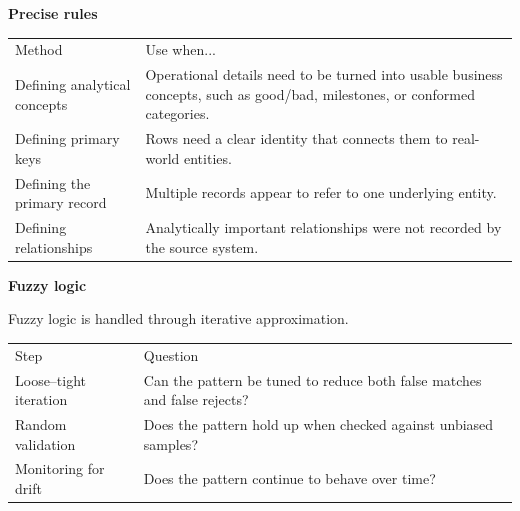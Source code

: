 \documentclass[10pt,openany,10pt]{book}
\newcounter{none}
\let\podeToprule\toprule
\let\podeMidrule\midrule
\let\podeBottomrule\bottomrule
\renewcommand{\toprule}{\arrayrulecolor{pbiGrid}\podeToprule}
\renewcommand{\midrule}{\arrayrulecolor{pbiGrid}\podeMidrule}
\renewcommand{\bottomrule}{\arrayrulecolor{pbiGrid}\podeBottomrule}
\begin{document}
\textbf{Precise rules}

{\def\LTcaptype{none} %
\begin{longtable}[]{@{}
  >{\raggedright\arraybackslash}p{}
  >{\raggedright\arraybackslash}p{}@{}}
\toprule\noalign{}
\begin{minipage}[b]{\linewidth}\raggedright
Method
\end{minipage} & \begin{minipage}[b]{\linewidth}\raggedright
Use when...
\end{minipage} \\
\midrule\noalign{}
\endhead
\bottomrule\noalign{}
\endlastfoot
Defining analytical concepts & Operational details need to be turned
into usable business concepts, such as good/bad, milestones, or
conformed categories. \\
Defining primary keys & Rows need a clear identity that connects them to
real-world entities. \\
Defining the primary record & Multiple records appear to refer to one
underlying entity. \\
Defining relationships & Analytically important relationships were not
recorded by the source system. \\
\end{longtable}
}

\textbf{Fuzzy logic}

Fuzzy logic is handled through iterative approximation.

{\def\LTcaptype{none} %
\begin{longtable}[]{@{}
  >{\raggedright\arraybackslash}p{}
  >{\raggedright\arraybackslash}p{}@{}}
\toprule\noalign{}
\begin{minipage}[b]{\linewidth}\raggedright
Step
\end{minipage} & \begin{minipage}[b]{\linewidth}\raggedright
Question
\end{minipage} \\
\midrule\noalign{}
\endhead
\bottomrule\noalign{}
\endlastfoot
Loose--tight iteration & Can the pattern be tuned to reduce both false
matches and false rejects? \\
Random validation & Does the pattern hold up when checked against
unbiased samples? \\
Monitoring for drift & Does the pattern continue to behave over time? \\
\end{longtable}
}
\end{document}
